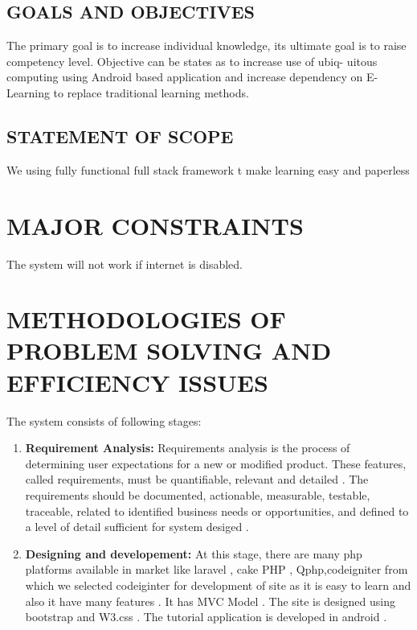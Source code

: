 \documentclass[oneside,a4paper,12pt]{report}
\begin{document}
{\subsection{GOALS AND OBJECTIVES}
\hspace*{0.3in}The primary goal is to increase individual knowledge, its ultimate goal is to raise
competency level. Objective can be states as to increase use of ubiq- uitous computing
using Android based application and increase dependency on E-Learning to
replace traditional learning methods.\\

\subsection{STATEMENT OF SCOPE}
\hspace*{0.3in}We using fully functional full stack framework t make learning easy and paperless\\

\section{MAJOR CONSTRAINTS}
\hspace*{0.3in}The system will not work if internet is disabled.\\

\section{METHODOLOGIES OF PROBLEM SOLVING AND EFFICIENCY ISSUES}
\hspace*{0.3in}The system consists of following stages:
\begin{enumerate}
\item \textbf{Requirement Analysis:} Requirements analysis is the process of determining user expectations for a new or modified product. These features, called requirements, must be quantifiable, relevant and detailed .  The requirements should be documented, actionable, measurable, testable, traceable, related to identified business needs or opportunities, and defined to a level of detail sufficient for system desiged .
\\
\item \textbf{Designing and developement:} At this stage, there are
many php platforms available in market like laravel , cake PHP , Qphp,codeigniter
from which we selected codeiginter  for development of site as it is 
easy to learn and also it have many features . It has MVC Model .   
The site is designed using bootstrap and W3.css . The tutorial application is developed in android . 


\end{enumerate}}
\end{document}
